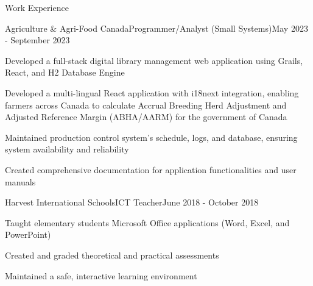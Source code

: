 \documentclass{article}
\newlength{\tabin}
\newlength{\secsep}
\newcommand{\lineunder}{\vspace*{-8pt} \\ \hspace*{-6pt} \hrulefill \\ \vspace*{-15pt}}
\newenvironment{tabbedsection}[1]{
	\begin{list}{}{
		\setlength{\itemsep}{0pt}
		\setlength{\labelsep}{0pt}
		\setlength{\labelwidth}{0pt}
		\setlength{\leftmargin}{\tabin}
		\setlength{\rightmargin}{\tabin}
		\setlength{\listparindent}{0pt}
		\setlength{\parsep}{0pt}
		\setlength{\parskip}{0pt}
		\setlength{\partopsep}{0pt}
		\setlength{\topsep}{#1}
	}
		\item[]
		}{
	\end{list}}
\newenvironment{resume_section}[1]{
	\vspace{2\secsep}
	\textsc{\large#1}
	\lineunder
	\begin{tabbedsection}{\secsep}
	}{\end{tabbedsection}}
\newenvironment{subitems}{
	\renewcommand{\labelitemi}{-}
	\begin{itemize}
		\setlength{\labelsep}{1em}
		}{
	\end{itemize}}
\newenvironment{resume_employer}[4]{
	\vspace{\secsep}
	\begin{minipage}[t]{0.75\linewidth}
		\textbf{#1}\\
		\small #2
	\end{minipage}%
	\begin{minipage}[t]{0.25\linewidth}
		\hfill \footnotesize #4
	\end{minipage}
	\vspace{0.1em}\\
	\begin{tabbedsection}{0pt}
		\begin{subitems}
		}{\end{subitems}
	\end{tabbedsection}}
\begin{document}
	\begin{resume_section}{Work Experience}
		\begin{resume_employer}{Agriculture \& Agri-Food Canada}{Programmer/Analyst (Small Systems)}{}{May 2023 - September 2023}
			\item Developed a full-stack digital library management web application using Grails, React, and H2 Database Engine
			\item Developed a multi-lingual React application with i18next integration, enabling farmers across Canada to calculate Accrual Breeding Herd Adjustment and Adjusted Reference Margin (ABHA/AARM) for the government of Canada
			\item Maintained production control system's schedule, logs, and database, ensuring system availability and reliability
			\item Created comprehensive documentation for application functionalities and user manuals
		\end{resume_employer}
		
		\begin{resume_employer}{Harvest International Schools}{ICT Teacher}{}{June 2018 - October 2018}
			\item Taught elementary students Microsoft Office applications (Word, Excel, and PowerPoint)
			\item Created and graded theoretical and practical assessments
			\item Maintained a safe, interactive learning environment
		\end{resume_employer}
	\end{resume_section}
	
\end{document}
